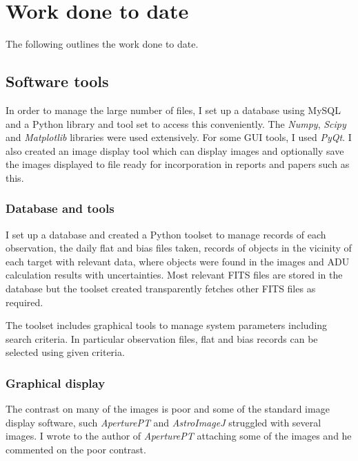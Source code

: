 \section{Work done to date}
\protect\label{section:workdonetodate}

The following outlines the work done to date.

\subsection{Software tools}
\protect\label{section:softwaretools}

In order to manage the large number of files, I set up a database using MySQL
and a Python library and tool set to access this conveniently. The
\textit{Numpy}, \textit{Scipy} and \textit{Matplotlib} libraries were used
extensively. For some GUI tools, I used \textit{PyQt}. I also created an image
display tool which can display images and optionally save the images displayed
to file ready for incorporation in reports and papers such as this.

\subsubsection{Database and tools}
\protect\label{seciion:databaseandtools}

I set up a database and created a Python toolset to manage records of
each observation, the daily flat and bias files taken, records of objects in the vicinity of each target with
relevant data, where objects were found in the images and ADU calculation
results with uncertainties. Most relevant FITS files are stored in the database
but the toolset created transparently fetches other FITS files as required.

The toolset includes graphical tools to manage system parameters including
search criteria. In particular observation files, flat and bias records can be
selected using given criteria.

\subsubsection{Graphical display}
\protect\label{section:graphicdisplay}

The contrast on many of the images is poor and some of the standard image
display software, such \textit{AperturePT} and \textit{AstroImageJ} struggled
with several images. I wrote to the author of \textit{AperturePT} attaching some
of the images and he commented on the poor contrast.

